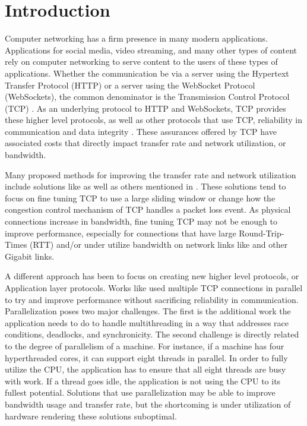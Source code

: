 \chapter{Introduction}

Computer networking has a firm presence in many modern applications. Applications for social media, video streaming, and many other types of content rely on computer networking to serve content to the users of these types of applications. Whether the communication be via a server using the Hypertext Transfer Protocol (HTTP) or a server using the WebSocket Protocol (WebSockets), the common denominator is the Transmission Control Protocol (TCP) \cite{fielding1999hypertext}\cite{fette2011websocket}. As an underlying protocol to HTTP and WebSockets, TCP provides these higher level protocols, as well as other protocols that use TCP, reliability in communication and data integrity \cite{cerf1978specification}. These assurances offered by TCP have associated costs that directly impact transfer rate and network utilization, or bandwidth.

Many proposed methods for improving the transfer rate and network utilization include solutions like \cite{brakmo1995tcp}\cite{wei2006fast}\cite{ha2008cubic} as well as others mentioned in \cite{ha2008cubic}\cite{He2002}. These solutions tend to focus on fine tuning TCP to use a large sliding window or change how the congestion control mechanism of TCP handles a packet loss event. As physical connections increase in bandwidth, fine tuning TCP may not be enough to improve performance, especially for connections that have large Round-Trip-Times (RTT) and/or under utilize bandwidth \cite{Fan2010} on network links like \cite{Pfister2001} and other Gigabit links.

A different approach has been to focus on creating new higher level protocols, or Application layer protocols. Works like \cite{Allman1995}\cite{Allman1997}\cite{Sivakumar2000psockets} used multiple TCP connections in parallel to try and improve performance without sacrificing reliability in communication. Parallelization poses two major challenges. The first is the additional work the application needs to do to handle multithreading in a way that addresses race conditions, deadlocks, and synchronicity. The second challenge is directly related to the degree of parallelism of a machine. For instance, if a machine has four hyperthreaded cores, it can support eight threads in parallel. In order to fully utilize the CPU, the application has to ensure that all eight threads are busy with work. If a thread goes idle, the application is not using the CPU to its fullest potential. Solutions that use parallelization may be able to improve bandwidth usage and transfer rate, but the shortcoming is under utilization of hardware rendering these solutions suboptimal.

